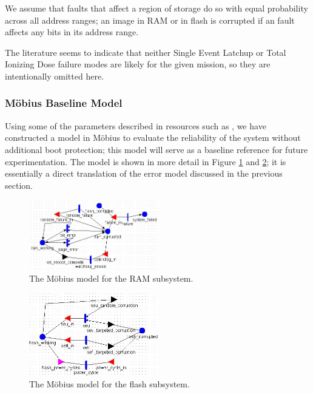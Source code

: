 We assume that faults that affect a region of storage do so with equal probability across all address ranges; an image in RAM or in flash is corrupted if an fault affects any bits in its address range.

The literature seems to indicate that neither Single Event Latchup \cite{Langley2004SEE} or Total Ionizing Dose \cite{Likar2010Novel, Oldham2008TID, Herrmann2013InSitu} failure modes are likely for the given mission, so they are intentionally omitted here.

\subsubsection{M\"obius Baseline Model}

Using some of the parameters described in resources such as \cite{Oldham2008TID}, we have constructed a model in M\"obius to evaluate the reliability of the system without additional boot protection; this model will serve as a baseline reference for future experimentation.  The model is shown in more detail in Figure \ref{fig:ram} and \ref{fig:flash}; it is essentially a direct translation of the error model discussed in the previous section.

\begin{figure}
\includegraphics[width=0.5\textwidth]{ram_model}
\caption{The M\"obius model for the RAM subsystem.}
\label{fig:ram}
\end{figure}

\begin{figure}
\includegraphics[width=0.5\textwidth]{flash_model}
\caption{The M\"obius model for the flash subsystem.}
\label{fig:flash}
\end{figure}



